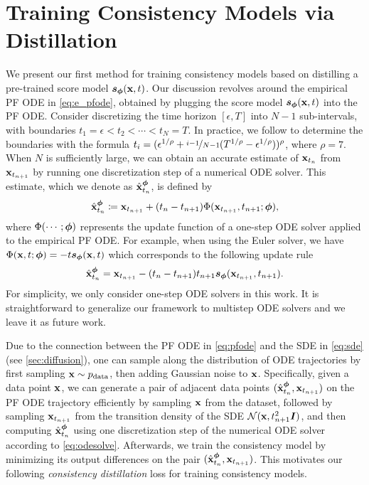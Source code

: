 \section{Training Consistency Models via Distillation}\label{sec:distillation}

We present our first method for training consistency models based on distilling a pre-trained score model ${\bm{s}}_{\bm{\phi}}({\mathbf{x}}, t)$. Our discussion revolves around the empirical PF ODE in \cref{eq:e_pfode}, obtained by plugging the score model ${\bm{s}}_{\bm{\phi}}({\mathbf{x}}, t)$ into the PF ODE. Consider discretizing the time horizon $[\epsilon, T]$ into $N-1$ sub-intervals, with boundaries $t_1=\epsilon < t_2 < \cdots < t_{N}=T$. In practice, we follow \citet{karras2022edm} to determine the boundaries with the formula $t_i = (\epsilon^{1/\rho} + \nicefrac{i-1}{N-1} (T^{1/\rho} - \epsilon^{1/\rho}))^\rho$, where $\rho=7$. When $N$ is sufficiently large, we can obtain an accurate estimate of ${\mathbf{x}}_{t_n}$ from ${\mathbf{x}}_{t_{n+1}}$ by running one discretization step of a numerical ODE solver. This estimate, which we denote as $\hat{{\mathbf{x}}}_{t_n}^{\bm{\phi}}$, is defined by
\begin{align}
   \hat{{\mathbf{x}}}_{t_n}^{\bm{\phi}} \coloneqq {\mathbf{x}}_{t_{n+1}} + (t_n - t_{n+1})\Phi({\mathbf{x}}_{t_{n+1}}, t_{n+1}; {\bm{\phi}}),\label{eq:odesolve}
\end{align}
where $\Phi(\cdots; {\bm{\phi}})$ represents the update function of a one-step ODE solver applied to the empirical PF ODE. For example, when using the Euler solver, we have $\Phi({\mathbf{x}}, t; {\bm{\phi}}) = -t {\bm{s}}_{\bm{\phi}}({\mathbf{x}}, t)$ which corresponds to the following update rule
\begin{align*}
    \hat{{\mathbf{x}}}_{t_n}^{\bm{\phi}} = {\mathbf{x}}_{t_{n+1}} - (t_n - t_{n+1}) t_{n+1} {\bm{s}}_{\bm{\phi}}({\mathbf{x}}_{t_{n+1}}, t_{n+1}).
\end{align*}
For simplicity, we only consider one-step ODE solvers in this work. It is straightforward to generalize our framework to multistep ODE solvers and we leave it as future work.

Due to the connection between the PF ODE in \cref{eq:pfode} and the SDE in \cref{eq:sde} (see \cref{sec:diffusion}), one can sample along the distribution of ODE trajectories by first sampling ${\mathbf{x}} \sim p_\text{data}$, then adding Gaussian noise to ${\mathbf{x}}$. Specifically, given a data point ${\mathbf{x}}$, we can generate a pair of adjacent data points $(\hat{{\mathbf{x}}}_{t_n}^{\bm{\phi}}, {\mathbf{x}}_{t_{n+1}})$ on the PF ODE trajectory efficiently by sampling ${\mathbf{x}}$ from the dataset, followed by sampling ${\mathbf{x}}_{t_{n+1}}$ from the transition density of the SDE $\mathcal{N}({\mathbf{x}}, t_{n+1}^2 {\bm{I}})$, and then computing $\hat{{\mathbf{x}}}_{t_n}^{\bm{\phi}}$ using one discretization step of the numerical ODE solver according to \cref{eq:odesolve}. Afterwards, we train the consistency model by minimizing its output differences on the pair $(\hat{{\mathbf{x}}}_{t_n}^{\bm{\phi}}, {\mathbf{x}}_{t_{n+1}})$. This motivates our following \emph{consistency distillation} loss for training consistency models.

